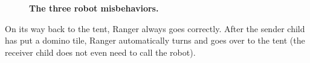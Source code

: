 \documentclass{sig-alternate}
\begin{document}
\begin{figure}[!t]
  \centering
{}

  \caption[The Three Robot Misbehaviors]{\small \textbf{The three robot
  misbehaviors.}}

  \label{fig:domino-misbehavior}
\end{figure}

On its way back to the tent, Ranger always goes correctly. After the sender
child has put a domino tile, Ranger automatically turns and goes over to the
tent (the receiver child does not even need to call the robot).

\end{document}
